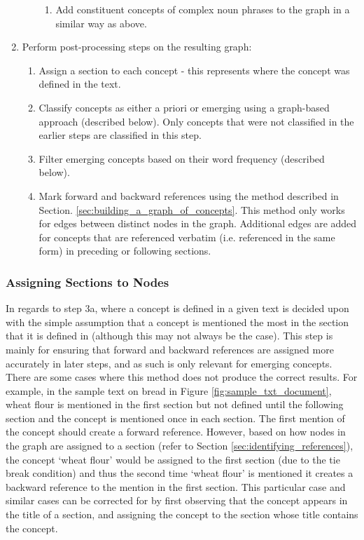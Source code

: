 \documentclass[12pt]{article}
\theoremstyle{grammarstyle}
\begin{document}
\begin{enumerate}
\begin{enumerate}
\begin{enumerate}
            \item Add constituent concepts of complex noun phrases to the graph in a similar way as above.
        \end{enumerate}
    \end{enumerate}
    \item Perform post-processing steps on the resulting graph:
    \begin{enumerate}
        \item Assign a section to each concept - this represents where the concept was defined in the text.
        \item Classify concepts as either a priori or emerging using a graph-based approach (described below). Only concepts that were not classified in the earlier steps are classified in this step.
        \item Filter emerging concepts based on their word frequency (described below).
        \item Mark forward and backward references using the method described in Section. \ref{sec:building_a_graph_of_concepts}. This method only works for edges between distinct nodes in the graph. Additional edges are added for concepts that are referenced verbatim (i.e. referenced in the same form) in preceding or following sections.
    \end{enumerate}
\end{enumerate}

\subsubsection{Assigning Sections to Nodes}
In regards to step 3a, where a concept is defined in a given text is decided upon with the simple assumption that a concept is mentioned the most in the section that it is defined in (although this may not always be the case). This step is mainly for ensuring that forward and backward references are assigned more accurately in later steps, and as such is only relevant for emerging concepts.
There are some cases where this method does not produce the correct results.
For example, in the sample text on bread in Figure \ref{fig:sample_txt_document}, wheat flour is mentioned in the first section but not defined until the following section and the concept is mentioned once in each section. The first mention of the concept should create a forward reference. However, based on how nodes in the graph are assigned to a section (refer to Section \ref{sec:identifying_references}), the concept `wheat flour' would be assigned to the first section (due to the tie break condition) and thus the second time `wheat flour' is mentioned it creates a backward reference to the mention in the first section. This particular case and similar cases can be corrected for by first observing that the concept appears in the title of a section, and assigning the concept to the section whose title contains the concept.
\end{document}
